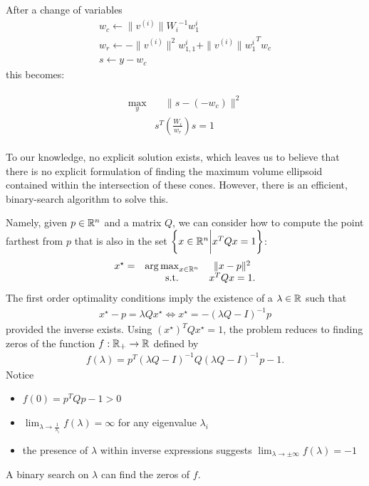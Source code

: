 After a change of variables
\begin{align*}
w_c \gets \|v^{(i)}\|{W_i}^{-1}w_1^i \\
w_r \gets  - \|v^{(i)}\|^2{w_{1,1}^i} + \|v^{(i)}\|{{w_1^i}}^Tw_c \\
s \gets y - w_c
\end{align*}
this becomes:

\begin{align}
\label{cone_feasibility_check}
\begin{array}{ccc}
\max_{y} & \quad \|s - \left(-w_c\right)\|^2  \\
 & s^T\left(\frac {W_i}{w_r}\right)s = 1
 \end{array}
\end{align}

To our knowledge, no explicit solution exists, 
which leaves us to believe that there is no explicit formulation of finding the maximum volume ellipsoid contained within the intersection of these cones.  
However, there is an efficient, binary-search algorithm to solve this.


Namely, given 
$p \in \mathbb R^n$ and a matrix $Q$,
we can consider how to compute  the point farthest from $p$ that is also in the set $\left\{x \in \mathbb R^n \bigg | x^TQx = 1 \right\}$:
\begin{align}
\begin{array}{ccc}
x^{\star} = &\operatorname*{arg\,max}_{x \in \mathbb R^n} & \|x - p\|^2 \\
& \textrm{s.t.} & x^TQx = 1.
\end{array} \label{antiprojection_problem}
\end{align}
The first order optimality conditions imply the existence of a $\lambda \in \mathbb R$ such that
\begin{align*}
x^{\star} - p = \lambda Qx^{\star} %
\Longleftrightarrow x^{\star} = -\left(\lambda Q - I\right)^{-1}p
\end{align*}
provided the inverse exists.
Using $\left(x^{\star}\right)^TQx^{\star} = 1$, the problem reduces to finding zeros of the function $f : \mathbb R_+ \to \mathbb R$ defined by
\begin{align*}
f(\lambda) = p^T\left(\lambda Q - I\right)^{-1}Q\left(\lambda Q - I\right)^{-1}p - 1.
\end{align*}
Notice 
\begin{itemize}
\item $f(0) = p^TQp - 1 > 0$
\item $\lim_{\lambda \to \frac 1 {\lambda_i}} f(\lambda) = \infty$ for any eigenvalue $\lambda_i$
\item the presence of $\lambda$ within inverse expressions suggests $\lim_{\lambda \to \pm \infty}f(\lambda) = -1$
\end{itemize}
A binary search on $\lambda$ can find the zeros of $f$.


